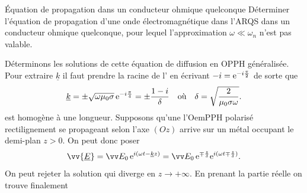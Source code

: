 \documentclass[12pt,fancy]{cours}
\begin{document}
\begin{exemple}{Équation de propagation dans un conducteur ohmique quelconque}
  Déterminer l’équation de propagation d’une onde électromagnétique dans l'ARQS dans un conducteur ohmique quelconque, pour lequel l'approximation $\omega \ll \omega_n$ n'est pas valable.
\end{exemple}

 Déterminons les solutions de cette équation de diffusion en OPPH généralisée. 
 Pour extraire $\underline{k}$ il faut prendre la racine de l' en écrivant $-i=\mathrm{e}^{-i\frac{\pi}{2}}$ de sorte que
\begin{equation}
\underline{k}=\pm\sqrt{\omega\mu_0\sigma}\,\mathrm{e}^{-i\frac{\pi}{4}}=\pm\frac{1-i}{\delta}\quad\text{où}\quad\delta=\sqrt{\frac{2}{\mu_0\sigma\omega}}.
\end{equation}
est homogène à une longueur.
Supposons qu’une l’OemPPH polarisé rectilignement se propageant selon l’axe $(Oz)$ arrive sur un métal occupant le demi-plan $z>0$. On peut donc poser
\begin{equation}
 \vv{\underline{E}}=\Vec{E_0}\,\e^{i(\omega t-\underline{k}z)}=\Vec{E_0}\,\e^{\mp \frac{z}{\delta}}\e^{i(\omega t\mp \frac{z}{\delta})}.
 \end{equation}
 On peut rejeter la solution qui diverge en $z\rightarrow+\infty$. En prenant la partie réelle on trouve finalement
\end{document}
